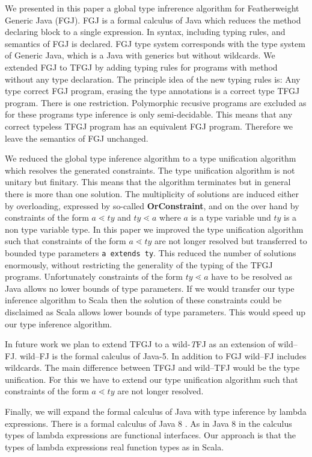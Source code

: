We presented in this paper a global type infrerence algorithm for Featherweight
Generic Java (FGJ). FGJ is a formal calculus of Java which reduces the method
declaring block to a single expression. In
\cite{DBLP:journals/toplas/IgarashiPW01} syntax, including typing rules, and semantics of FGJ is
declared. FGJ type system corresponds with the type system of Generic Java, which is a Java with generics but without wildcards. We extended FGJ to TFGJ by adding typing rules for
programs with method without any type declaration. The principle idea of the
new typing rules is: Any type correct FGJ program, erasing the type
annotations is a correct type TFGJ program. There is one
restriction. Polymorphic recusive programs are excluded as for these programs
type inference is only semi-decidable. This means that any correct typeless TFGJ program
has an equivalent FGJ program. Therefore we leave the semantics of FGJ unchanged.

We reduced the global type inference algorithm to a type unification algorithm
which resolves the generated constraints. The type unification algorithm is not
unitary but finitary. This means that the algorithm terminates but in general
there is more than one solution. The multiplicity of solutions are induced
either by overloading, expressed by so-called \textbf{OrConstraint}, and on the over hand by constraints of the form $a
\lessdot ty$ and $ty \lessdot a$ where $a$ is a type variable und $ty$ is a non
type variable type. In this paper we improved the type unification algorithm
such that constraints of the form $a \lessdot ty$ are not longer resolved but
transferred to bounded type parameters \texttt{a extends ty}. This reduced the
number of solutions enormously, without restricting the generality of the typing
of the TFGJ programs. Unfortunately constraints of the form $ty \lessdot a$ have
to be resolved as Java allows no lower bounds of type parameters. If we would
transfer our type inference algorithm to Scala then the solution of these
constraints could be disclaimed as Scala allows lower bounds of type
parameters. This would speed up our type inference algorithm.

In future work we plan to extend TFGJ to a wild-\emph{T}FJ as an extension of
wild--FJ. wild--FJ \cite{TEP05} is the formal calculus of
Java-5. In addition to FGJ wild--FJ includes wildcards. The main
difference between TFGJ and wild--TFJ would be the type unification. For this we have
to extend our type unification algorithm \cite{plue09_1} such that constraints of
the form $a \lessdot ty$ are not longer resolved.

Finally, we will expand the formal calculus of Java with type inference by
lambda expressions. There is a formal calculus of Java 8 \cite{BBDGV18}. As in
Java 8 in the calculus types of lambda expressions are functional interfaces. Our approach is
that the types of lambda expressions real function types as in Scala.